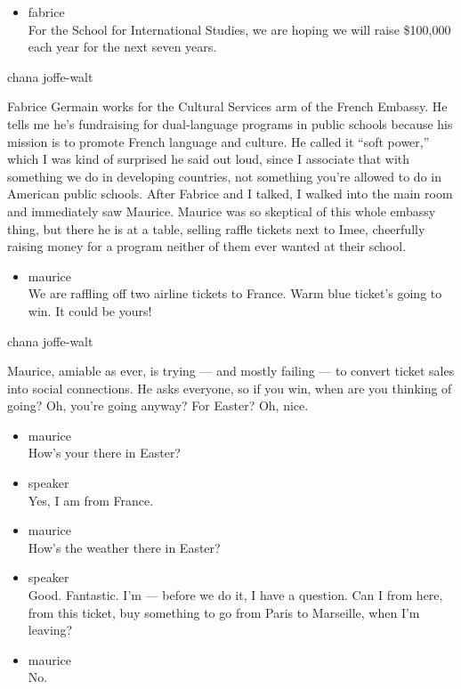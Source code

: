 \begin{itemize}
\tightlist
\item
  fabrice\\
  For the School for International Studies, we are hoping we will raise
  \$100,000 each year for the next seven years.
\end{itemize}

chana joffe-walt

Fabrice Germain works for the Cultural Services arm of the French
Embassy. He tells me he's fundraising for dual-language programs in
public schools because his mission is to promote French language and
culture. He called it ``soft power,'' which I was kind of surprised he
said out loud, since I associate that with something we do in developing
countries, not something you're allowed to do in American public
schools. After Fabrice and I talked, I walked into the main room and
immediately saw Maurice. Maurice was so skeptical of this whole embassy
thing, but there he is at a table, selling raffle tickets next to Imee,
cheerfully raising money for a program neither of them ever wanted at
their school.

\begin{itemize}
\tightlist
\item
  maurice\\
  We are raffling off two airline tickets to France. Warm blue ticket's
  going to win. It could be yours!
\end{itemize}

chana joffe-walt

Maurice, amiable as ever, is trying --- and mostly failing --- to
convert ticket sales into social connections. He asks everyone, so if
you win, when are you thinking of going? Oh, you're going anyway? For
Easter? Oh, nice.

\begin{itemize}
\item
  maurice\\
  How's your there in Easter?
\item
  speaker\\
  Yes, I am from France.
\item
  maurice\\
  How's the weather there in Easter?
\item
  speaker\\
  Good. Fantastic. I'm --- before we do it, I have a question. Can I
  from here, from this ticket, buy something to go from Paris to
  Marseille, when I'm leaving?
\item
  maurice\\
  No.
\end{itemize}

